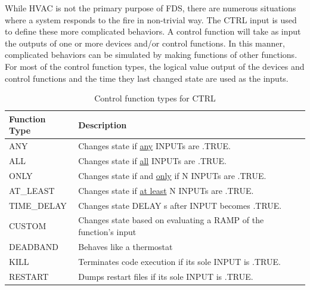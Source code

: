 \documentclass[11pt]{book}
\begin{document}
While HVAC is not the primary purpose of FDS, there are numerous situations where a system responds to the fire in non-trivial way.
The {\ct CTRL} input is used to define these more complicated behaviors.
A control function will take as input the outputs of one or more devices and/or control functions.
In this manner, complicated behaviors can be simulated by making functions of other functions.  For most of the
control function types, the logical value output of the devices and control functions and the time they last changed
state are used as the inputs.


\begin{table}[h!]
\caption{Control function types for {\ct CTRL}}
\label{tab:funcvalues}
\begin{center}
\begin{tabular}{|l||l|}
\hline
Function Type                     & Description   \\ \hline \hline
{\ct ANY}                         & Changes state if \underline{any} {\ct INPUT}s are {\ct .TRUE.}     \\ \hline
{\ct ALL}                         & Changes state if \underline{all} {\ct INPUT}s are {\ct .TRUE.}  \\ \hline
{\ct ONLY}                        & Changes state if and \underline{only} if {\ct N} {\ct INPUT}s are {\ct .TRUE.}     \\ \hline
{\ct AT\_LEAST}                   & Changes state if \underline{at least} {\ct N} {\ct INPUT}s are {\ct .TRUE.}     \\ \hline \hline
{\ct TIME\_DELAY}                 & Changes state {\ct DELAY} s after {\ct INPUT} becomes {\ct .TRUE.}      \\ \hline
{\ct CUSTOM}                      & Changes state based on evaluating a {\ct RAMP} of the function's input     \\ \hline
{\ct DEADBAND}                    & Behaves like a thermostat     \\ \hline
{\ct KILL}                        & Terminates code execution if its sole {\ct INPUT} is {\ct .TRUE.}  \\ \hline
{\ct RESTART}                     & Dumps restart files if its sole {\ct INPUT} is {\ct .TRUE.} \\ \hline
\end{tabular}
\end{center}
\end{table}
\end{document}
